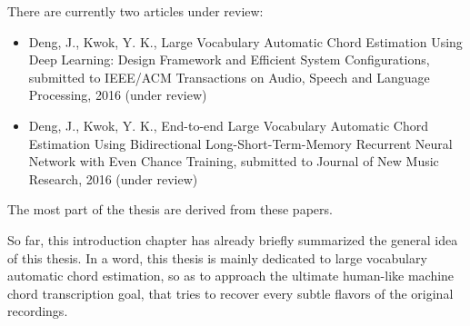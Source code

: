 There are currently two articles under review:
\begin{itemize}
\item Deng, J., Kwok, Y. K., Large Vocabulary Automatic Chord Estimation Using Deep Learning: Design Framework and Efficient System Configurations, submitted to IEEE/ACM Transactions on Audio, Speech and Language Processing, 2016 (under review)
\item Deng, J., Kwok, Y. K., End-to-end Large Vocabulary Automatic Chord Estimation Using Bidirectional Long-Short-Term-Memory Recurrent Neural Network with Even Chance Training, submitted to Journal of New Music Research, 2016 (under review)
\end{itemize}
The most part of the thesis are derived from these papers.

So far, this introduction chapter has already briefly summarized the general idea of this thesis. In a word, this thesis is mainly dedicated to large vocabulary automatic chord estimation, so as to approach the ultimate human-like machine chord transcription goal, that tries to recover every subtle flavors of the original recordings.



